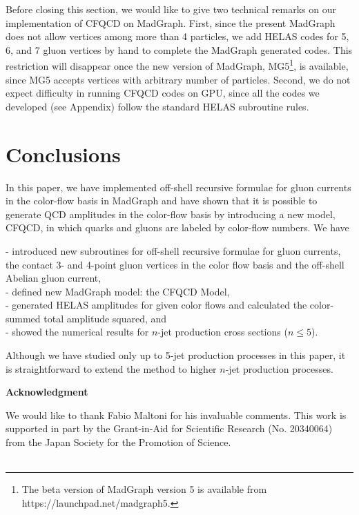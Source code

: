   Before closing this section, we would like to give two
 technical remarks on our implementation of CFQCD on MadGraph.
 First, since the present MadGraph\cite{MG/ME} does not allow vertices
 among more than 4 particles, we add HELAS codes for 5, 6,
 and 7 gluon vertices by hand to complete the MadGraph
 generated codes.
 This restriction will disappear once the new version of
 MadGraph, MG5\footnote{The beta version of MadGraph version 5 is
 available from https://launchpad.net/madgraph5.},
 is available, since MG5 accepts
 vertices with arbitrary number of particles.
 Second, we do not expect difficulty in running CFQCD codes
 on GPU, since all the codes we developed (see Appendix)
 follow the standard HELAS subroutine rules.

\section{Conclusions}
\label{conclusion}
 In this paper, we have implemented off-shell recursive
 formulae for gluon currents in the color-flow basis in MadGraph and have
 shown that it is possible to generate QCD amplitudes
 in the color-flow basis by introducing a new model,
 CFQCD, in which quarks and gluons are labeled by
 color-flow numbers.
 We have

 \noindent
 - introduced new subroutines for off-shell recursive
 formulae for gluon currents, the contact 3- and 4-point gluon vertices
 in the color flow basis and the off-shell Abelian gluon current,\\
 - defined new MadGraph model: the CFQCD Model,\\
 - generated HELAS amplitudes for given color flows
 and calculated the color-summed total amplitude squared,
 and \\
 - showed the numerical results for $n$-jet production
 cross sections ($n\leq 5$).

 Although we have studied only up to 5-jet production processes in this paper, it is straightforward to extend
 the method to higher $n$-jet production processes.

\begin{center}
{\bf Acknowledgment}
\end{center}
We would like to thank Fabio Maltoni for his invaluable comments.  This work is supported in part by
 the Grant-in-Aid for Scientific Research (No. 20340064)
 from the Japan Society for the Promotion of Science.\\

\\

